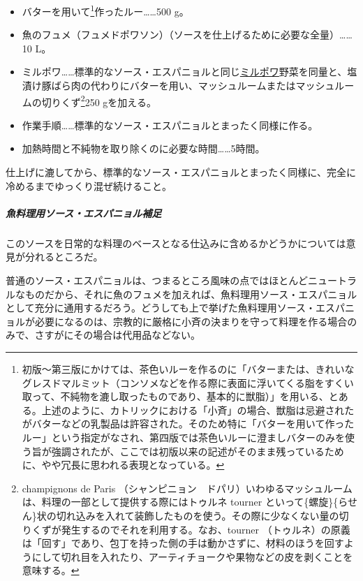 \begin{recette}
\begin{itemize}
\item
  バターを用いて\footnote{初版〜第三版にかけては、茶色いルーを作るのに「バターまたは、きれいなグレスドマルミット（コンソメなどを作る際に表面に浮いてくる脂をすくい取って、不純物を漉し取ったものであり、基本的に獣脂）」を用いる、とある。上述のように、カトリックにおける「小斉」の場合、獣脂は忌避されたがバターなどの乳製品は許容された。そのため特に「バターを用いて作ったルー」という指定がなされ、第四版では茶色いルーに澄ましバターのみを使う旨が強調されたが、ここでは初版以来の記述がそのまま残っているために、やや冗長に思われる表現となっている。}作ったルー\ldots{}\ldots{}500
  g。
\item
  魚のフュメ（フュメドポワソン）（ソースを仕上げるために必要な全量）\ldots{}\ldots{}10
  L。
\item
  ミルポワ\ldots{}\ldots{}標準的なソース・エスパニョルと同じ\protect\hyperlink{mirepoix}{ミルポワ}野菜を同量と、塩漬け豚ばら肉の代わりにバターを用い、マッシュルームまたはマッシュルームの切りくず\footnote{champignons
    de Paris
    （シャンピニョン　ドパリ）いわゆるマッシュルームは、料理の一部として提供する際にはトゥルネ
    tourner
    といって\{螺旋\}\{らせん\}状の切れ込みを入れて装飾したものを使う。その際に少なくない量の切りくずが発生するのでそれを利用する。なお、tourner
    （トゥルネ）の原義は「回す」であり、包丁を持った側の手は動かさずに、材料のほうを回すようにして切れ目を入れたり、アーティチョークや果物などの皮を剥くことを意味する。}250
  gを加える。
\item
  作業手順\ldots{}\ldots{}標準的なソース・エスパニョルとまったく同様に作る。
\item
  加熱時間と不純物を取り除くのに必要な時間\ldots{}\ldots{}5時間。
\end{itemize}

仕上げに漉してから、標準的なソース・エスパニョルとまったく同様に、完全に冷めるまでゆっくり混ぜ続けること。

\hypertarget{observation-sauce-espagnole-maigre}{%
\subparagraph{魚料理用ソース・エスパニョル補足}\label{observation-sauce-espagnole-maigre}}

このソースを日常的な料理のベースとなる仕込みに含めるかどうかについては意見が分れるところだ。

普通のソース・エスパニョルは、つまるところ風味の点ではほとんどニュートラルなものだから、それに魚のフュメを加えれば、魚料理用ソース・エスパニョルとして充分に通用するだろう。どうしても上で挙げた魚料理用ソース・エスパニョルが必要になるのは、宗教的に厳格に小斉の決まりを守って料理を作る場合のみで、さすがにその場合は代用品などない。


\end{recette}
